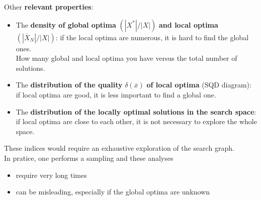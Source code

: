 \newpage

Other \textbf{relevant properties}:
\begin{itemize}
	\item The \textbf{density of global optima} $( |X^\ast|/|X |)$ \textbf{and local optima} $( | \overline{X}_N | / |X | )$: if the local optima are numerous, it is hard to find the global ones. \\
	How many global and local optima you have versus the total number of solutions. \\
	
	\item The \textbf{distribution of the quality} $\delta (\overline{x})$ \textbf{of local optima} (SQD diagram): if local optima are good, it is less important to find a global one. \\
	
	\item The \textbf{distribution of the locally optimal solutions in the search space}: if local optima are close to each other, it is not necessary to explore the whole space.\\
\end{itemize}

These indices would require an exhaustive exploration of the search graph.\\

In pratice, one performs a sampling and these analyses
\begin{itemize}
	\item require very long times
	\item can be misleading, especially if the global optima are unknown
\end{itemize}

\newpage

